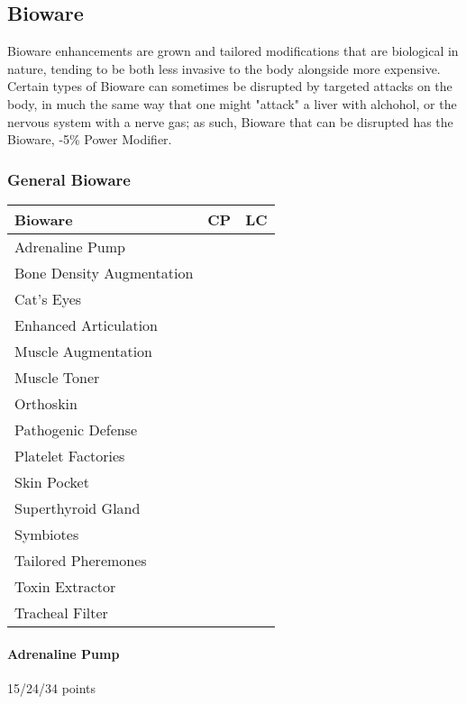 \begin{multicols*}{3}
	\subsection{Bioware}
	
	Bioware enhancements are grown and tailored modifications that are biological in nature, tending to be both less invasive to the body alongside more expensive. Certain types of Bioware can sometimes be disrupted by targeted attacks on the body, in much the same way that one might "attack" a liver with alchohol, or the nervous system with a nerve gas; as such, Bioware that can be disrupted has the Bioware, -5\% Power Modifier.
	
	\subsubsection{General Bioware}
	
	\begin{center}
		\begin{tabularx}{0.32\textwidth}{|X|c|c|}
			\hline
			Bioware & CP & LC\\
			\hline
			\hline
			Adrenaline Pump & & \\
			Bone Density Augmentation & & \\
			Cat's Eyes & & \\
			Enhanced Articulation & & \\
			Muscle Augmentation & & \\
			Muscle Toner & & \\
			Orthoskin & & \\
			Pathogenic Defense & & \\
			Platelet Factories & & \\
			Skin Pocket & & \\
			Superthyroid Gland & & \\
			Symbiotes & & \\
			Tailored Pheremones & & \\
			Toxin Extractor & & \\
			Tracheal Filter & & \\
			\hline
		\end{tabularx}
	\end{center}
	
	\paragraph{Adrenaline Pump}
	\begin{flushright}
		15/24/34 points
	\end{flushright}
	

\end{multicols*}
